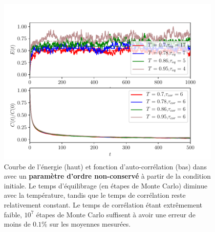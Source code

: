 \begin{figure}[h]
	\centering
	\includegraphics[scale=1]{numerical/sos-glau-eq-cor.pdf}
	\caption{Courbe de l'énergie (haut) et fonction d'auto-corrélation (bas) dans avec un \textbf{paramètre d'ordre non-conservé} à partir de la condition initiale. Le temps d'équilibrage (en étapes de Monte Carlo) diminue avec la température, tandis que le temps de corrélation reste relativement constant. Le temps de corrélation étant extrêmement faible, $10^7$ étapes de Monte Carlo suffisent à avoir une erreur de moins de $0.1\%$ sur les moyennes mesurées.}
	\label{eq-glau}
\end{figure}
	
